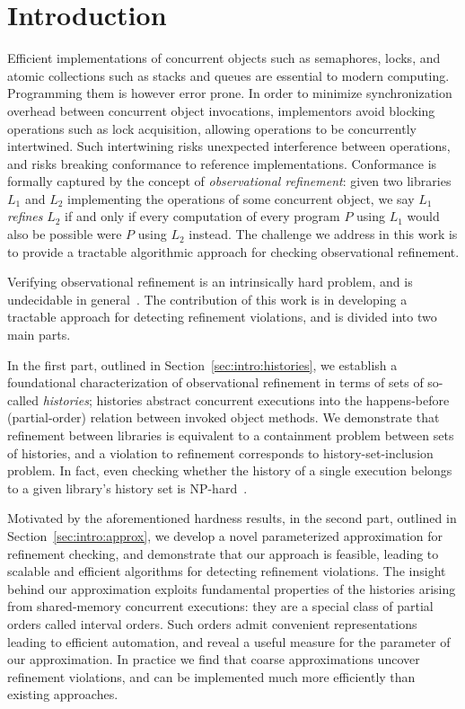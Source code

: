 \section{Introduction}

Efficient implementations of concurrent objects such as semaphores, locks,
and atomic collections such as stacks and queues are essential
to modern computing. Programming them is however error prone. In order to
minimize synchronization overhead between concurrent object invocations,
implementors avoid blocking operations such as lock acquisition, allowing
operations to be concurrently intertwined. Such intertwining risks unexpected
interference between operations, and risks breaking conformance to reference
implementations. Conformance is formally captured by the concept of
\emph{observational refinement}: given two libraries $L_1$ and $L_2$
implementing the operations of some concurrent object, we say $L_1$
\emph{refines} $L_2$ if and only if every computation of every program $P$
using $L_1$ would also be possible were $P$ using $L_2$ instead. The challenge
we address in this work is to provide a tractable algorithmic approach for
checking observational refinement.

Verifying observational refinement is an intrinsically hard problem, and is
undecidable in general~\cite{conf/esop/BouajjaniEEH13}. The contribution of
this work is in developing a tractable approach for detecting refinement
violations, and is divided into two main parts.

In the first part, outlined in Section~\ref{sec:intro:histories}, we establish
a foundational characterization of observational refinement in terms of sets of
so-called \emph{histories}; histories abstract concurrent executions into the
happens-before (partial-order) relation between invoked object methods. We
demonstrate that refinement between libraries is equivalent to a containment
problem between sets of histories, and a violation to refinement corresponds to
history-set-inclusion problem. In fact, even checking whether the history of a
single execution belongs to a given library's history set is
NP-hard~\cite{journals/siamcomp/GibbonsK97}.

Motivated by the aforementioned hardness results, in the second part, outlined
in Section~\ref{sec:intro:approx}, we develop a novel parameterized
approximation for refinement checking, and demonstrate that our approach is
feasible, leading to scalable and efficient algorithms for detecting refinement
violations. The insight behind our approximation exploits fundamental
properties of the histories arising from shared-memory concurrent executions:
they are a special class of partial orders called interval orders. Such orders
admit convenient representations leading to efficient automation, and reveal a
useful measure for the parameter of our approximation. In practice we find that
coarse approximations uncover refinement violations, and can be implemented
much more efficiently than existing approaches.

